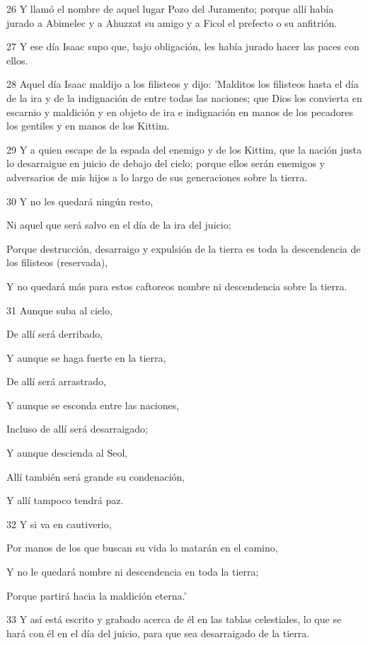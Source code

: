 \par 26 Y llamó el nombre de aquel lugar Pozo del Juramento; porque allí había jurado a Abimelec y a Ahuzzat su amigo y a Ficol el prefecto o su anfitrión.
\par 27 Y ese día Isaac supo que, bajo obligación, les había jurado hacer las paces con ellos.
\par 28 Aquel día Isaac maldijo a los filisteos y dijo: 'Malditos los filisteos hasta el día de la ira y de la indignación de entre todas las naciones; que Dios los convierta en escarnio y maldición y en objeto de ira e indignación en manos de los pecadores los gentiles y en manos de los Kittim.
\par 29 Y a quien escape de la espada del enemigo y de los Kittim, que la nación justa lo desarraigue en juicio de debajo del cielo; porque ellos serán enemigos y adversarios de mis hijos a lo largo de sus generaciones sobre la tierra.
\par    
\par 30 Y no les quedará ningún resto,  
\par     Ni aquel que será salvo en el día de la ira del juicio;  
\par     Porque destrucción, desarraigo y expulsión de la tierra es toda la descendencia de los filisteos (reservada),  
\par     Y no quedará más para estos caftoreos nombre ni descendencia sobre la tierra.
\par    
\par 31 Aunque suba al cielo,  
\par     De allí será derribado,
\par    
\par     Y aunque se haga fuerte en la tierra,  
\par     De allí será arrastrado,
\par    
\par     Y aunque se esconda entre las naciones,  
\par     Incluso de allí será desarraigado;
\par    
\par     Y aunque descienda al Seol,  
\par     Allí también será grande su condenación,  
\par     Y allí tampoco tendrá paz.  
\par    
\par 32 Y si va en cautiverio,  
\par     Por manos de los que buscan su vida lo matarán en el camino,  
\par     Y no le quedará nombre ni descendencia en toda la tierra;  
\par     Porque partirá hacia la maldición eterna.'
\par    
\par 33 Y así está escrito y grabado acerca de él en las tablas celestiales, lo que se hará con él en el día del juicio, para que sea desarraigado de la tierra.

